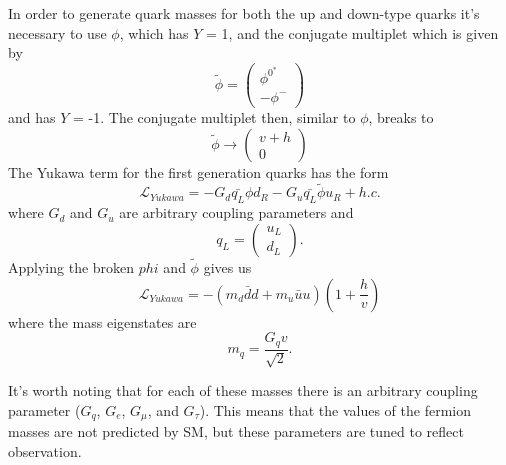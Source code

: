 In order to generate quark masses for both the up and down-type quarks it's necessary to use $\phi$, which has $Y$ = 1, and the conjugate multiplet which is given by
\begin{equation}
	\tilde{\phi} = \left(
	\begin{array}{c}
	\phi^{0^*} \\
	-\phi^-
	\end{array}
	\right)
\end{equation}
and has $Y$ = -1.  The conjugate multiplet then, similar to $\phi$, breaks to 
\begin{equation}
	\tilde{\phi} \rightarrow \left(
	\begin{array}{c}
		v + h \\
		0
	\end{array}
	\right)
\end{equation}
The Yukawa term for the first generation quarks has the form
\begin{equation}
	\mathcal{L}_{Yukawa} = -G_d\bar{q_L}\phi d_R - G_u\bar{q_L}\tilde{\phi}u_R + h.c.
\end{equation}
where $G_d$ and $G_u$ are arbitrary coupling parameters and 
\begin{equation}
	q_L = \left(
	\begin{array}{c}
		u_L \\
		d_L
	\end{array}
	\right).
\end{equation}
Applying the broken $phi$ and $\tilde{\phi}$ gives us
\begin{equation}
	\mathcal{L}_{Yukawa} = -(m_d \bar{d}d + m_u\bar{u}u)(1 + \frac{h}{v})
\end{equation}
where the mass eigenstates are 
\begin{equation}
	m_q = \frac{G_qv}{\sqrt{2}}.
\end{equation}

It's worth noting that for each of these masses there is an arbitrary coupling parameter ($G_q$, $G_e$, $G_\mu$, and $G_\tau$).  This means that the values of the fermion masses are not predicted by SM, but these parameters are tuned to reflect observation.



